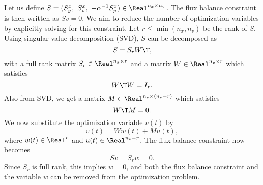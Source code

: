 \documentclass[a4paper,11pt,DIV12]{scrartcl}
\theoremstyle{remark}
\begin{document}
Let us define $S = (S^x_y, \ S^x_v, \ -\alpha^{-1} S^x_p) \in \Real^{n_x \times n_v}$.
The flux balance constraint is then written as $S v = 0$.
We aim to reduce the number of optimization variables by explicitly solving for this constraint.
Let $r \leq \min(n_x, n_v)$ be the rank of $S$.
Using singular value decomposition (SVD), $S$ can be decomposed as
\begin{equation}
  \label{eq:stoich-svd}
  S = S_r W\T,
\end{equation}
with a full rank matrix $S_r \in \Real^{n_x \times r}$ and a matrix $W \in \Real^{n_v \times r}$ which satisfies
\begin{equation}
  \label{eq:svd-projection}
  W\T W = I_r.
\end{equation}
Also from SVD, we get a matrix $M \in \Real^{n_v \times (n_v - r)}$ which satisfies
\begin{equation}
  \label{eq:svd-zero}
  W\T M = 0.
\end{equation}
We now substitute the optimization variable $v(t)$ by
\begin{equation}
  \label{eq:v-substitution}
  v(t) = W w(t) + M u(t),
\end{equation}
where $w(t) \in \Real^{r}$ and $u(t) \in \Real^{n_v - r}$.
The flux balance constraint now becomes
\begin{equation}
  \label{eq:fbc-revised}
  S v = S_r w = 0.
\end{equation}
Since $S_r$ is full rank, this implies $w = 0$, and both the flux balance constraint and the variable $w$ can be removed from the optimization problem.
\end{document}
